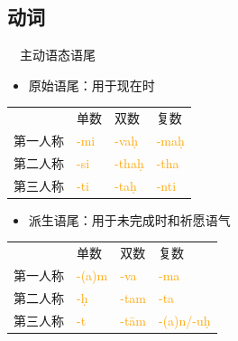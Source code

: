 \documentclass[17pt]{beamer}
\newcommand{\wordending}[1]{\textcolor{Orange}{\nobreakdash-#1}}
\begin{document}
\subsection{动词}
\begin{frame}{\insertsubsection ~~主动语态语尾}
  \small
  \centering
  \begin{itemize} 
      \item 原始语尾：用于现在时
  \end{itemize}
  \begin{tabular}{@{}llll@{}} %
      & 单数  & 双数  & 复数 \\
    第一人称 & \wordending{mi} & \wordending{vaḥ}  & \wordending{maḥ}  \\
    第二人称 & \wordending{si} & \wordending{thaḥ} & \wordending{tha}   \\
    第三人称 & \wordending{ti} & \wordending{taḥ} & \wordending{nti}  \\
  \end{tabular}
  \begin{itemize} 
      \item 派生语尾：用于未完成时和祈愿语气
  \end{itemize}
  \begin{tabular}{@{}llll@{}} %
      & 单数  & 双数  & 复数 \\
    第一人称 & \wordending{(a)m} & \wordending{va}  & \wordending{ma}  \\
    第二人称 & \wordending{ḥ} & \wordending{tam} & \wordending{ta}   \\
    第三人称 & \wordending{t} & \wordending{tām} & \wordending{(a)n/\nobreakdash-uḥ}  \\
  \end{tabular}
    
\end{frame}
\end{document}
